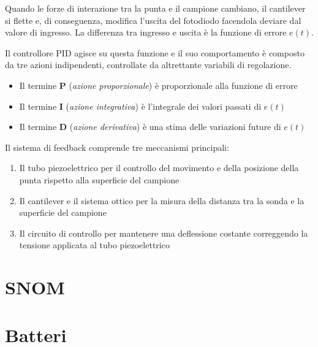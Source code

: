 \documentclass[../main.tex]{subfiles}
\begin{document}
Quando le forze di interazione tra la punta e il campione cambiano, il cantilever si flette e, di conseguenza, modifica l'uscita del fotodiodo facendola deviare dal valore di ingresso. La differenza tra ingresso e uscita è la funzione di errore $e(t)$.

Il controllore PID agisce su questa funzione e il suo comportamento è composto da tre azioni indipendenti, controllate da altrettante variabili di regolazione. 
\begin{itemize}
	\item Il termine \textbf{P} (\textit{azione proporzionale}) è proporzionale alla funzione di errore
	\item Il termine \textbf{I} (\textit{azione integrativa}) è l'integrale dei valori passati di $e(t)$
	\item Il termine \textbf{D} (\textit{azione derivativa}) è una stima delle variazioni future di $e(t)$
\end{itemize}

Il sistema di feedback comprende tre meccanismi principali:
\begin{enumerate}
	\item Il tubo piezoelettrico per il controllo del movimento e della posizione della punta rispetto alla superficie del campione
	\item Il cantilever e il sistema ottico per la misura della distanza tra la sonda e la superficie del campione
	\item Il circuito di controllo per mantenere una deflessione costante correggendo la tensione applicata al tubo piezoelettrico
\end{enumerate}

\section{SNOM}

\section{Batteri}
\end{document}

